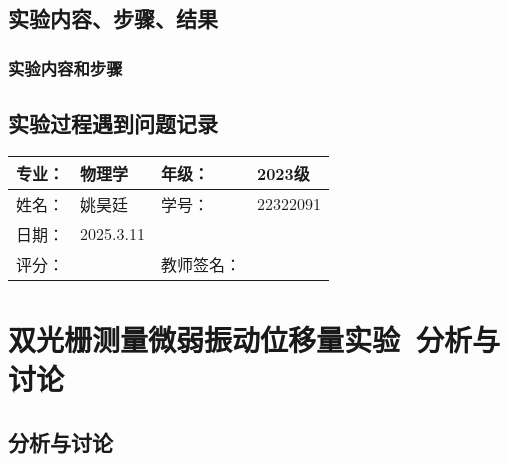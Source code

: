 \documentclass[dvipsnames, svgnames,a4paper,11pt]{article}
\newcommand{\exname}{双光栅测量微弱振动位移量实验}%
\begin{document}
\subsection{实验内容、步骤、结果}
\subsubsection{实验内容和步骤}

\subsection{实验过程遇到问题记录}


\clearpage
{}
\begin{table}
	\renewcommand\arraystretch{1.7}
	\begin{tabularx}{\textwidth}{|X|X|X|X|}
	\hline
	专业：& 物理学 &年级：& 2023级\\
	\hline
	姓名： &姚昊廷& 学号：&22322091 \\
	\hline
    日期：&2025.3.11 &  &\\
	\hline
	评分：&&教师签名：&\\
	\hline
	\end{tabularx}
\end{table}

\section{\exname\ \textbf{分析与讨论}}
\subsection{分析与讨论}

\clearpage
%
%
\end{document}
